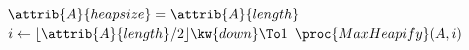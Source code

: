 \begin{codebox}
\li $\attrib{A}{heapsize} = \attrib{A}{length}$
\li \For $i \gets \floor{\attrib{A}{length}/2} \kw{ down} \To 1$
\li 	\Do
			$\proc{MaxHeapify}(A,i)$
		\End
\end{codebox}